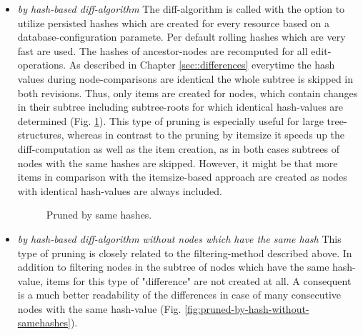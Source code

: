 \begin{itemize}
\item \emph{by hash-based diff-algorithm} The diff-algorithm is called with the option to utilize persisted hashes which are created for every resource based on a database-configuration paramete. Per default rolling hashes which are very fast are used. The hashes of ancestor-nodes are recomputed for all edit-operations. As described in Chapter \ref{sec::differences} everytime the hash values during node-comparisons are identical the whole subtree is skipped in both revisions. Thus, only items are created for nodes, which contain changes in their subtree including subtree-roots for which identical hash-values are determined (Fig. \ref{fig:pruned-by-hash}). This type of pruning is especially useful for large tree-structures, whereas in contrast to the pruning by itemsize it speeds up the diff-computation as well as the item creation, as in both cases subtrees of nodes with the same hashes are skipped. However, it might be that more items in comparison with the itemsize-based approach are created as nodes with identical hash-values are always included.

\begin{figure}[tb]
\caption{\label{fig:pruned-by-hash} Pruned by same hashes.}
\end{figure}

\item \emph{by hash-based diff-algorithm without nodes which have the same hash} This type of pruning is closely related to the filtering-method described above. In addition to filtering nodes in the subtree of nodes which have the same hash-value, items for this type of "difference" are not created at all. A consequent is a much better readability of the differences in case of many consecutive nodes with the same hash-value (Fig. \ref{fig:pruned-by-hash-without-samehashes}).


\end{itemize}
